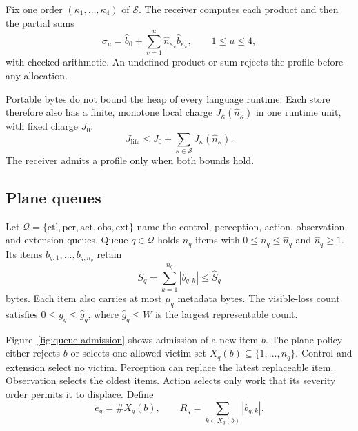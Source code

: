 \documentclass[11pt,a4paper]{article}
\theoremstyle{definition}
\begin{document}
Fix one order $(\kappa_1,\ldots,\kappa_4)$ of $\mathcal{S}$. The receiver computes each
product and then the partial sums
\begin{equation}\label{eq:partial-sums}
\sigma_u=\hat b_0+\sum_{v=1}^{u}\hat n_{\kappa_v}\hat b_{\kappa_v},\qquad 1\leq u\leq4,
\end{equation}
with checked arithmetic. An undefined product or sum rejects the profile before any
allocation.

Portable bytes do not bound the heap of every language runtime. Each store therefore
also has a finite, monotone local charge $J_\kappa(\hat n_\kappa)$ in one runtime unit,
with fixed charge $J_0$:
\begin{equation}\label{eq:local-charge}
J_{\mathrm{life}}\leq J_0+\sum_{\kappa\in\mathcal{S}}J_\kappa(\hat n_\kappa).
\end{equation}
The receiver admits a profile only when both bounds hold.

\subsection{Plane queues}

Let $\mathcal{Q}=\{\mathrm{ctl},\mathrm{per},\mathrm{act},\mathrm{obs},\mathrm{ext}\}$
name the control, perception, action, observation, and extension queues. Queue
$q\in\mathcal{Q}$ holds $n_q$ items with $0\leq n_q\leq\hat n_q$ and $\hat n_q\geq1$.
Its items $b_{q,1},\ldots,b_{q,n_q}$ retain
\begin{equation}\label{eq:queue-bytes}
S_q=\sum_{k=1}^{n_q}|b_{q,k}|\leq\hat S_q
\end{equation}
bytes. Each item also carries at most $\mu_q$ metadata bytes. The visible-loss count
satisfies $0\leq g_q\leq\hat g_q$, where $\hat g_q\leq W$ is the largest representable
count.

Figure~\ref{fig:queue-admission} shows admission of a new item $b$. The plane policy
either rejects $b$ or selects one allowed victim set
$X_q(b)\subseteq\{1,\ldots,n_q\}$. Control and extension select no victim. Perception
can replace the latest replaceable item. Observation selects the oldest items. Action
selects only work that its severity order permits it to displace. Define
\begin{equation}\label{eq:victims}
e_q=\#X_q(b),\qquad R_q=\sum_{k\in X_q(b)}|b_{q,k}|.
\end{equation}

\end{document}
